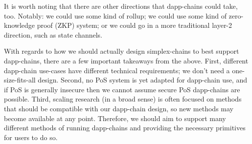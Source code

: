It is worth noting that there are other directions that dapp-chains could take, too.
Notably: we could use some kind of rollup; we could use some kind of zero-knowledge proof (ZKP) system; or we could go in a more traditional layer-2 direction, such as state channels.


With regards to how we should actually design simplex-chains to best support dapp-chains, there are a few important takeaways from the above.
First, different dapp-chain use-cases have different technical requirements; we don't need a one-size-fits-all design.
Second, no PoS system is yet adapted for dapp-chain use, and if PoS is generally insecure then we cannot assume secure PoS dapp-chains are possible.
Third, scaling research (in a broad sense) is often focused on methods that should be compatible with our dapp-chain design, so new methods may become available at any point.
Therefore, we should aim to support many different methods of running dapp-chains and providing the necessary primitives for users to do so.
